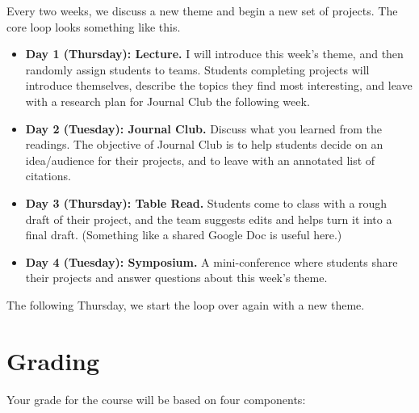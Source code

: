 \documentclass[11pt, letterpaper]{article}
\begin{document}
Every two weeks, we discuss a new theme and begin a new set of projects. The core loop looks something like this. 

\begin{itemize}
	\item \textbf{Day 1 (Thursday): Lecture.} I will introduce this week's theme, and then randomly assign students to teams. Students completing projects will introduce themselves, describe the topics they find most interesting, and leave with a research plan for Journal Club the following week.
	\item \textbf{Day 2 (Tuesday): Journal Club.} Discuss what you learned from the readings. The objective of Journal Club is to help students decide on an idea/audience for their projects, and to leave with an annotated list of citations. 
	\item \textbf{Day 3 (Thursday): Table Read.} Students come to class with a rough draft of their project, and the team suggests edits and helps turn it into a final draft. (Something like a shared Google Doc is useful here.)
	\item \textbf{Day 4 (Tuesday): Symposium.} A mini-conference where students share their projects and answer questions about this week's theme.
\end{itemize}

\noindent The following Thursday, we start the loop over again with a new theme.

\section*{Grading}

Your grade for the course will be based on four components:
\end{document}
